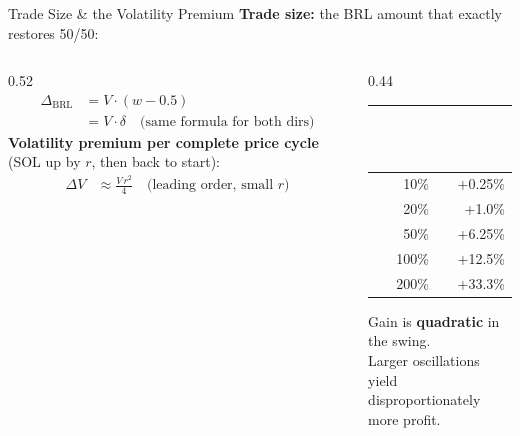 \documentclass[aspectratio=169,10pt]{beamer}
\begin{document}
\begin{frame}{Trade Size \& the Volatility Premium}
\vspace{0.2em}
{\small\color{BodyText}
\textbf{Trade size:} the BRL amount that exactly restores 50/50:}

\vspace{0.3em}
\small
\begin{columns}[T]
\begin{column}{0.52\textwidth}
\begin{align*}
  \Delta_{\text{BRL}} &= V \cdot (w - 0.5) \\[0.3em]
  &= V \cdot \delta \quad\text{(same formula for both dirs)}
\end{align*}
\vspace{0.2em}
{\small\color{BodyText}
\textbf{Volatility premium per complete price cycle}
(SOL up by $r$, then back to start):}
\begin{align*}
  \Delta V &\approx \frac{V\,r^2}{4} \quad\text{(leading order, small }r\text{)}
\end{align*}
\end{column}
\begin{column}{0.44\textwidth}
\vspace{0.3em}
\begin{tabular}{@{}r r@{}}
\toprule
\rowcolor{Navy}
  \textcolor{white}{\textbf{Price swing } $r$} &
  \textcolor{white}{\textbf{Gain per cycle}} \\
\midrule
10\%  & +0.25\% \\
20\%  & +1.0\%  \\
50\%  & +6.25\% \\
100\% & +12.5\% \\
200\% & +33.3\% \\
\bottomrule
\end{tabular}
\vspace{0.3em}

{\scriptsize\color{MutedText}
Gain is \textbf{quadratic} in the swing.\\
Larger oscillations yield\\
disproportionately more profit.}
\end{column}
\end{columns}
\end{frame}
\end{document}
